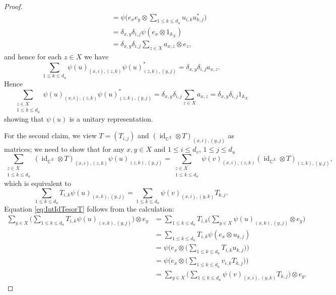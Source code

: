 \documentclass[10pt,a4paper]{amsart}
\def\C{\mathbb{C}}
\def\id{\operatorname{id}}
\begin{document}
\begin{proof}
\begin{align*}
		&\hspace{3cm}=\psi\Big(e_xe_y\otimes\sum_{1\le k\le d_u}u_{i,k}u_{k,j}^*\Big)\\
		&\hspace{3cm}=\delta_{x,y}\delta_{i,j}\psi(e_x\otimes 1_{\mathbb{A}_X})\\
		&\hspace{3cm}=\delta_{x,y}\delta_{i,j} \sum_{z\in X}a_{x,z}\otimes e_z,
	\end{align*}
	and hence for each $z\in X$ we have 
	\[
	\sum_{1\le k\le d_u}\psi(u)_{(x,i),(z,k)}\psi(u)_{(z,k),(y,j)}^*=\delta_{x,y}\delta_{i,j} a_{x,z}.
	\]
	Hence 
	\[
	\sum_{\substack{z\in X\\ 1\le k\le d_u}}\psi(u)_{(x,i),(z,k)}\psi(u)_{(z,k),(y,j)}^*=\delta_{x,y}\delta_{i,j}\sum_{z\in X}a_{x,z}=\delta_{x,y}\delta_{i,j}1_{\mathbb{A}_X}
	\]
	showing that $\psi(u)$ is a unitary representation. 
	
	For the second claim, we view $T=(T_{i,j})$ and $(\id_{\C^X}\otimes T)_{(x,i),(y,j)}$ as matrices; we need to show that for any $x,y\in X$ and $1\leq i \leq d_v$, $1\leq j \leq d_u$
	\[
	\sum_{\substack{z\in X\\ 1\le k\le d_u}}(\id_{\C^X}\otimes T)_{(x,i),(z,k)}\psi(u)_{(z,k),(y,j)}=\sum_{\substack{z\in X\\ 1\le k\le d_u}}\psi(v)_{(x,i),(z,k)}(\id_{\C^X}\otimes T)_{(z,k),(y,j)},
	\]
	which is equivalent to 
	\begin{equation}\label{eq:IntIdTesorT}
		\sum_{1\le k\le d_u}T_{i,k}\psi(u)_{(x,k),(y,j)}=\sum_{1\le k\le d_u}\psi(v)_{(x,i),(y,k)}T_{k,j}.
	\end{equation}
	Equation \ref{eq:IntIdTesorT} follows from the calculation:
	\begin{align*}
		\sum_{y\in X}\Big(\sum_{1\le k\le d_u}T_{i,k}\psi(u)_{(x,k),(y,j)}\Big)\otimes e_y 
		&= \sum_{1\le k\le d_u}T_{i,k}\Big(\sum_{y\in X}\psi(u)_{(x,k),(y,j)}\otimes e_y\Big)\\
		&= \sum_{1\le k\le d_u}T_{i,k}\psi(e_x\otimes u_{k,j})\\
		&=\psi\Big(e_x\otimes \Big(\sum_{1\le k\le d_u}T_{i,k}u_{k,j}\Big)\Big)\\
		&=\psi\Big(e_x\otimes \Big(\sum_{1\le k\le d_u}v_{i,k}T_{k,j}\Big)\Big)\\
		&=\sum_{y\in X}\Big(\sum_{1\le k\le d_u}\psi(v)_{(x,i),(y,k)}T_{k,j}\Big)\otimes e_y.
	\end{align*}
\end{proof}
\end{document}
